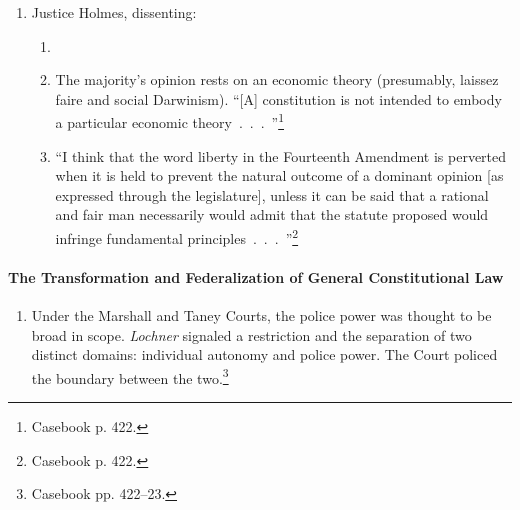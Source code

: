 \begin{enumerate}
\begin{enumerate}
        palpable invasion of rights secured by the fundamental 
        law.''\footnote{Casebook p. 420.} \item Baking is hazardous to your 
        health. This statute had a legitimate connection to public welfare.
        \item The Court's role is to defer to legislatures except in 
        extraordinary cases. The majority, on the other hand, held that courts 
        should review the reasonableness of legislation de novo. The majority 
        clearly distrusted legislatures---for instance, by calling the statute 
        in question ``mere pretext.''\footnote{Casebook p. 420.}
    \end{enumerate}
    \item Justice Holmes, dissenting:
    \begin{enumerate}
        \item
        \item The majority's opinion rests on an economic theory (presumably, 
        laissez faire and social Darwinism). ``[A] constitution is not 
        intended to embody a particular economic 
        theory~.~.~.~''\footnote{Casebook p. 422.}
        \item ``I think that the word liberty in the Fourteenth Amendment is 
        perverted when it is held to prevent the natural outcome of a dominant 
        opinion [as expressed through the legislature], unless it can be said 
        that a rational and fair man necessarily would admit that the statute 
        proposed would infringe fundamental 
        principles~.~.~.~''\footnote{Casebook p. 422.}
    \end{enumerate}
\end{enumerate}

\paragraph{The Transformation and Federalization of General Constitutional Law}

\begin{enumerate}
    \item Under the Marshall and Taney Courts, the police power was thought to 
    be broad in scope. \emph{Lochner} signaled a restriction and the 
    separation of two distinct domains: individual autonomy and police 
    power. The Court policed the boundary between the two.\footnote{Casebook 
    pp. 422--23.}
\end{enumerate}

